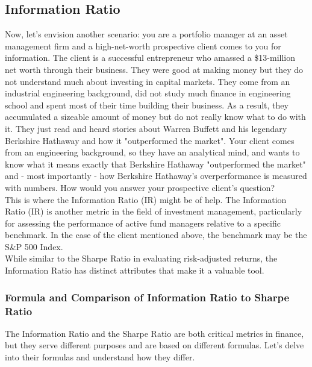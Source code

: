 \documentclass{article}
\begin{document}
\subsection{Information Ratio}

Now, let's envision another scenario: you are a portfolio manager at an asset management firm and a high-net-worth prospective client comes to you for information. The client is a successful entrepreneur who amassed a \$13-million net worth through their business. They were good at making money but they do not understand much about investing in capital markets. They come from an industrial engineering background, did not study much finance in engineering school and spent most of their time building their business. As a result, they accumulated a sizeable amount of money but do not really know what to do with it. They just read and heard stories about Warren Buffett and his legendary Berkshire Hathaway and how it "outperformed the market". Your client comes from an engineering background, so they have an analytical mind, and wants to know what it means exactly that Berkshire Hathaway "outperformed the market" and - most importantly - how Berkshire Hathaway's overperformance is measured with numbers. How would you answer your prospective client's question? \\

This is where the Information Ratio (IR) might be of help. The Information Ratio (IR) is another metric in the field of investment management, particularly for assessing the performance of active fund managers relative to a specific benchmark. In the case of the client mentioned above, the benchmark may be the S\&P 500 Index. \\

While similar to the Sharpe Ratio in evaluating risk-adjusted returns, the Information Ratio has distinct attributes that make it a valuable tool. \\

\subsubsection{Formula and Comparison of Information Ratio to Sharpe Ratio}

The Information Ratio and the Sharpe Ratio are both critical metrics in finance, but they serve different purposes and are based on different formulas. Let's delve into their formulas and understand how they differ.
\end{document}
